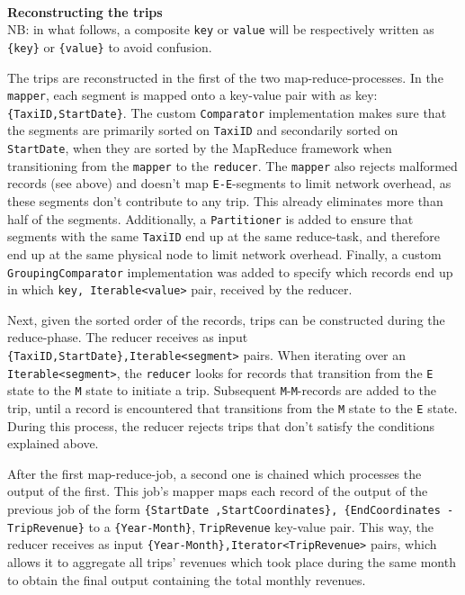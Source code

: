 \documentclass[11pt]{article}
\begin{document}

\noindent\\\textbf{Reconstructing the trips} \\
NB: in what follows, a composite \texttt{key} or \texttt{value} will be respectively written as \texttt{\{key\}} or \texttt{\{value\}} to avoid confusion.

\noindent The trips are reconstructed in the first of the two map-reduce-processes. In the \texttt{mapper}, each segment is mapped onto a key-value pair with as key: \texttt{\{TaxiID,StartDate\}}. The custom \texttt{Comparator} implementation makes sure that the segments are primarily sorted on \texttt{TaxiID} and secondarily sorted on \texttt{StartDate}, when they are sorted by the MapReduce framework when transitioning from the \texttt{mapper} to the \texttt{reducer}. The \texttt{mapper} also rejects malformed records (see above) and doesn't map \texttt{E-E}-segments to limit network overhead, as these segments don't contribute to any trip. This already eliminates more than half of the segments. Additionally, a \texttt{Partitioner} is added to ensure that segments with the same \texttt{TaxiID} end up at the same reduce-task, and therefore end up at the same physical node to limit network overhead. Finally, a custom \texttt{GroupingComparator} implementation was added to specify which records end up in which \texttt{key, Iterable<value>} pair, received by the reducer.

Next, given the sorted order of the records, trips can be constructed during the reduce-phase. The reducer receives as input \texttt{\{TaxiID,StartDate\},Iterable<segment>} pairs. When iterating over an \texttt{Iterable<segment>}, the \texttt{reducer} looks for records that transition from the \texttt{E} state to the \texttt{M} state to initiate a trip. Subsequent \texttt{M}-\texttt{M}-records are added to the trip, until a record is encountered that transitions from the \texttt{M} state to the \texttt{E} state. During this process, the reducer rejects trips that don't satisfy the conditions explained above.

After the first map-reduce-job, a second one is chained which processes the output of the first. This job's mapper maps each record of the output of the previous job of the form \texttt{\{StartDate ,StartCoordinates\}, \{EndCoordinates - TripRevenue\}} to a \texttt{\{Year-Month\}}, \texttt{TripRevenue} key-value pair. This way, the reducer receives as input \texttt{\{Year-Month\},Iterator<TripRevenue>} pairs, which allows it to aggregate all trips' revenues which took place during the same month to obtain the final output containing the total monthly revenues.
\end{document}

